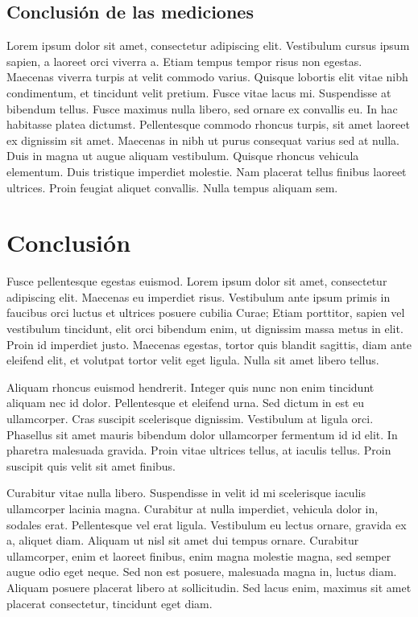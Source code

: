 \documentclass[final,inline,a4paper,narroweqnarray]{ieee}
\begin{document}
  \subsection{Conclusión de las mediciones}

Lorem ipsum dolor sit amet, consectetur adipiscing elit. Vestibulum cursus ipsum sapien, a laoreet orci viverra a. Etiam tempus tempor risus non egestas. Maecenas viverra turpis at velit commodo varius. Quisque lobortis elit vitae nibh condimentum, et tincidunt velit pretium. Fusce vitae lacus mi. Suspendisse at bibendum tellus. Fusce maximus nulla libero, sed ornare ex convallis eu. In hac habitasse platea dictumst. Pellentesque commodo rhoncus turpis, sit amet laoreet ex dignissim sit amet. Maecenas in nibh ut purus consequat varius sed at nulla. Duis in magna ut augue aliquam vestibulum. Quisque rhoncus vehicula elementum. Duis tristique imperdiet molestie. Nam placerat tellus finibus laoreet ultrices. Proin feugiat aliquet convallis. Nulla tempus aliquam sem.

\section{Conclusión}

Fusce pellentesque egestas euismod. Lorem ipsum dolor sit amet, consectetur adipiscing elit. Maecenas eu imperdiet risus. Vestibulum ante ipsum primis in faucibus orci luctus et ultrices posuere cubilia Curae; Etiam porttitor, sapien vel vestibulum tincidunt, elit orci bibendum enim, ut dignissim massa metus in elit. Proin id imperdiet justo. Maecenas egestas, tortor quis blandit sagittis, diam ante eleifend elit, et volutpat tortor velit eget ligula. Nulla sit amet libero tellus.

Aliquam rhoncus euismod hendrerit. Integer quis nunc non enim tincidunt aliquam nec id dolor. Pellentesque et eleifend urna. Sed dictum in est eu ullamcorper. Cras suscipit scelerisque dignissim. Vestibulum at ligula orci. Phasellus sit amet mauris bibendum dolor ullamcorper fermentum id id elit. In pharetra malesuada gravida. Proin vitae ultrices tellus, at iaculis tellus. Proin suscipit quis velit sit amet finibus.

Curabitur vitae nulla libero. Suspendisse in velit id mi scelerisque iaculis ullamcorper lacinia magna. Curabitur at nulla imperdiet, vehicula dolor in, sodales erat. Pellentesque vel erat ligula. Vestibulum eu lectus ornare, gravida ex a, aliquet diam. Aliquam ut nisl sit amet dui tempus ornare. Curabitur ullamcorper, enim et laoreet finibus, enim magna molestie magna, sed semper augue odio eget neque. Sed non est posuere, malesuada magna in, luctus diam. Aliquam posuere placerat libero at sollicitudin. Sed lacus enim, maximus sit amet placerat consectetur, tincidunt eget diam.
\end{document}
